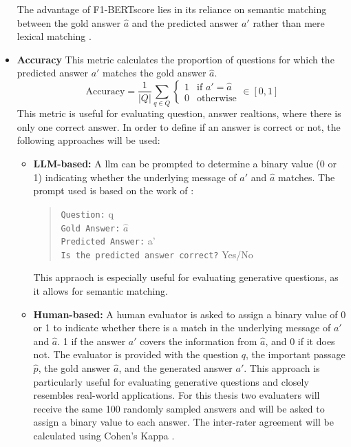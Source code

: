 \begin{itemize}
    The advantage of F1-BERTscore lies in its reliance on semantic matching between the gold answer $\hat{a}$ and the predicted answer $a'$ rather than mere lexical matching \cite{zhang_bertscore_2020}.
    

    \item \textbf{Accuracy} This metric calculates the proportion of questions for which the predicted answer $a'$ matches the gold answer $\hat{a}$. 
    \begin{equation}
        \text{Accuracy} = \frac{1}{|Q|} \sum_{q \in Q} 
        \begin{cases}
            1 & \text{if } a' = \hat{a} \\
            0 & \text{otherwise}
        \end{cases}
        \in [0,1]
    \end{equation}
    This metric is useful for evaluating question, answer realtions, where there is only one correct answer. In order to define if an answer is correct or not, the following approaches will be used:
    \begin{itemize}
        \item \textbf{LLM-based:} A \gls{llm} can be prompted to determine a binary value (0 or 1) indicating whether the underlying message of $a'$ and $\hat{a}$ matches. The prompt used is based on the work of \cite{kamalloo_evaluating_2023}:
        \begin{quote}
            \texttt{Question:} q \\
            \texttt{Gold Answer:} $\hat{a}$ \\
            \texttt{Predicted Answer:} a' \\
            \texttt{Is the predicted answer correct?} Yes/No
        \end{quote}
        This appraoch is especially useful for evaluating generative questions, as it allows for semantic matching.
        \item \textbf{Human-based:} A human evaluator is asked to assign a binary value of 0 or 1 to indicate whether there is a match in the underlying message of $a'$ and $\hat{a}$. 1 if the answer $a'$ covers the information from $\hat{a}$, and 0 if it does not. The evaluator is provided with the question $q$, the important passage $\hat{p}$, the gold answer $\hat{a}$, and the generated answer $a'$. This approach is particularly useful for evaluating generative questions and closely resembles real-world applications. For this thesis two evaluaters will receive the same 100 randomly sampled answers and will be asked to assign a binary value to each answer. The inter-rater agreement will be calculated using Cohen's Kappa \cite{cohen_coefficient_1960}. 
    \end{itemize}
\end{itemize}

